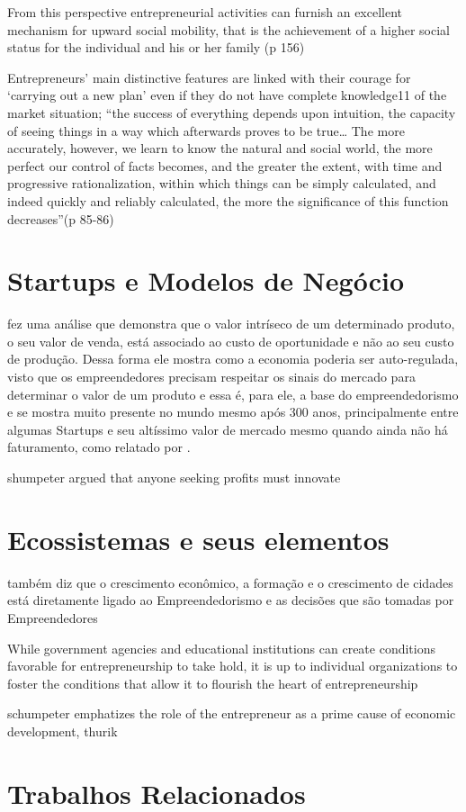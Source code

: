  From this
perspective entrepreneurial activities can furnish an excellent mechanism for upward
social mobility, that is the achievement of a higher social status for the individual and his
or her family (p 156)

Entrepreneurs’ main distinctive features are linked with their courage for ‘carrying
out a new plan’ even if they do not have complete knowledge11 of the market situation;
“the success of everything depends upon intuition, the capacity of seeing things in a way
which afterwards proves to be true… The more accurately, however, we learn to know
the natural and social world, the more perfect our control of facts becomes, and the
greater the extent, with time and progressive rationalization, within which things can be
simply calculated, and indeed quickly and reliably calculated, the more the significance of
this function decreases”(p 85-86)

\section{Startups e Modelos de Negócio}
\label{section:startups_e_modelos_de_negocio}

\cite{James1953} fez uma análise que demonstra que o valor intríseco de um determinado produto, o seu valor de venda, está associado ao custo de oportunidade e não ao seu custo de produção. Dessa forma ele mostra como a economia poderia ser auto-regulada, visto que os empreendedores precisam respeitar os sinais do mercado para determinar o valor de um produto e essa é, para ele, a base do empreendedorismo e se mostra muito presente no mundo mesmo após 300 anos, principalmente entre algumas Startups e seu altíssimo valor de mercado mesmo quando ainda não há faturamento, como relatado por \cite{Luckerson2013}.

shumpeter argued that anyone seeking profits must innovate


\section{Ecossistemas e seus elementos}
\label{section:ecossistemas_e_suas_pecas}

\cite{James1953} também diz que o crescimento econômico, a formação e o crescimento de cidades está diretamente ligado ao Empreendedorismo e as decisões que são tomadas por Empreendedores

While government agencies and educational institutions can create conditions favorable for entrepreneurship to take hold, it is up to individual organizations to foster the conditions that allow it to flourish the heart of entrepreneurship

schumpeter emphatizes the role of the entrepreneur as a prime cause of economic development,  thurik


\section{Trabalhos Relacionados}
\label{section:trabalhos_relacionados}

